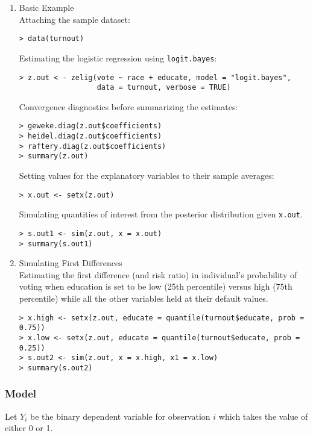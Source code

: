 \begin{enumerate}
\item {Basic Example} \\
Attaching the sample  dataset:
\begin{verbatim}
> data(turnout)
\end{verbatim}
Estimating the logistic regression using \texttt{logit.bayes}:
\begin{verbatim}
> z.out < - zelig(vote ~ race + educate, model = "logit.bayes",
                  data = turnout, verbose = TRUE)
\end{verbatim}
Convergence diagnostics before summarizing the estimates:
\begin{verbatim}
> geweke.diag(z.out$coefficients)
> heidel.diag(z.out$coefficients)
> raftery.diag(z.out$coefficients)
> summary(z.out)
\end{verbatim} %
Setting values for the explanatory variables to their sample averages:
\begin{verbatim}
> x.out <- setx(z.out)
\end{verbatim}
Simulating quantities of interest from the posterior distribution given 
\texttt{x.out}.
\begin{verbatim}
> s.out1 <- sim(z.out, x = x.out)
> summary(s.out1)
\end{verbatim}
\item {Simulating First Differences} \\
Estimating the first difference (and risk ratio) in individual's probability of
voting  when education is set to be low (25th percentile) versus 
high (75th percentile) while all the other variables held at their 
default values.
\begin{verbatim}
> x.high <- setx(z.out, educate = quantile(turnout$educate, prob = 0.75))
> x.low <- setx(z.out, educate = quantile(turnout$educate, prob = 0.25))
> s.out2 <- sim(z.out, x = x.high, x1 = x.low)
> summary(s.out2)
\end{verbatim}
\end{enumerate}

\subsubsection{Model}

Let $Y_{i}$ be the binary dependent variable for observation $i$ which takes
the value of either 0 or 1.

